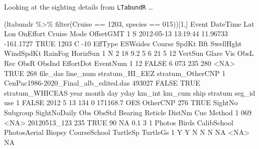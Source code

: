 \documentclass[
]{book}
\newenvironment{Shaded}{\begin{snugshade}}{\end{snugshade}}
\newcommand{\ConstantTok}[1]{\textcolor[rgb]{0.00,0.00,0.00}{#1}}
\newcommand{\DecValTok}[1]{\textcolor[rgb]{0.00,0.00,0.81}{#1}}
\newcommand{\FloatTok}[1]{\textcolor[rgb]{0.00,0.00,0.81}{#1}}
\newcommand{\FunctionTok}[1]{\textcolor[rgb]{0.00,0.00,0.00}{#1}}
\newcommand{\NormalTok}[1]{#1}
\newcommand{\SpecialCharTok}[1]{\textcolor[rgb]{0.00,0.00,0.00}{#1}}
\newcommand{\StringTok}[1]{\textcolor[rgb]{0.31,0.60,0.02}{#1}}
\begin{document}
Looking at the sighting details from \texttt{LTabundR} \ldots{}

\begin{Shaded}
\begin{Highlighting}[]
\NormalTok{(ltabundr }\SpecialCharTok{\%\textgreater{}\%} \FunctionTok{filter}\NormalTok{(Cruise }\SpecialCharTok{==} \DecValTok{1203}\NormalTok{, species }\SpecialCharTok{==} \StringTok{\textquotesingle{}015\textquotesingle{}}\NormalTok{))[}\DecValTok{1}\NormalTok{,]}
\NormalTok{  Event            DateTime      Lat       Lon OnEffort Cruise Mode OffsetGMT}
\DecValTok{1}\NormalTok{     S }\DecValTok{2012{-}05{-}13} \DecValTok{13}\SpecialCharTok{:}\DecValTok{19}\SpecialCharTok{:}\DecValTok{44} \FloatTok{11.96733} \SpecialCharTok{{-}}\FloatTok{161.1727}     \ConstantTok{TRUE}   \DecValTok{1203}\NormalTok{    C       }\SpecialCharTok{{-}}\DecValTok{10}
\NormalTok{  EffType ESWsides Course SpdKt Bft SwellHght WindSpdKt RainFog HorizSun}
\DecValTok{1}\NormalTok{       N        }\DecValTok{2}     \DecValTok{18}   \FloatTok{9.2}   \DecValTok{5}         \DecValTok{6}        \DecValTok{21}       \DecValTok{5}       \DecValTok{12}
\NormalTok{  VertSun Glare Vis ObsL Rec ObsR ObsInd EffortDot EventNum}
\DecValTok{1}      \DecValTok{12} \ConstantTok{FALSE}   \DecValTok{6}  \DecValTok{073} \DecValTok{235}  \DecValTok{280}   \SpecialCharTok{\textless{}}\ConstantTok{NA}\SpecialCharTok{\textgreater{}}      \ConstantTok{TRUE}      \DecValTok{268}
\NormalTok{                              file\_das line\_num stratum\_HI\_EEZ stratum\_OtherCNP}
\DecValTok{1}\NormalTok{ CenPac1986}\SpecialCharTok{{-}}\NormalTok{2020\_Final\_alb\_edited.das   }\DecValTok{493027}          \ConstantTok{FALSE}             \ConstantTok{TRUE}
\NormalTok{  stratum\_WHICEAS year month day yday km\_int   km\_cum ship  stratum seg\_id  use}
\DecValTok{1}           \ConstantTok{FALSE} \DecValTok{2012}     \DecValTok{5}  \DecValTok{13}  \DecValTok{134}      \DecValTok{0} \FloatTok{171168.7}\NormalTok{  OES OtherCNP    }\DecValTok{276} \ConstantTok{TRUE}
\NormalTok{  SightNo Subgroup SightNoDaily Obs ObsStd Bearing Reticle DistNm Cue Method}
\DecValTok{1}     \DecValTok{069}     \SpecialCharTok{\textless{}}\ConstantTok{NA}\SpecialCharTok{\textgreater{}}\NormalTok{ 20120513\_123 }\DecValTok{235}   \ConstantTok{TRUE}      \DecValTok{90}      \ConstantTok{NA}    \FloatTok{0.1}   \DecValTok{3}      \DecValTok{1}
\NormalTok{  Photos Birds CalibSchool PhotosAerial Biopsy CourseSchool TurtleSp TurtleGs}
\DecValTok{1}\NormalTok{      Y     Y           N            N      N           }\ConstantTok{NA}     \SpecialCharTok{\textless{}}\ConstantTok{NA}\SpecialCharTok{\textgreater{}}       \ConstantTok{NA}

\end{Highlighting}
\end{Shaded}
\end{document}

